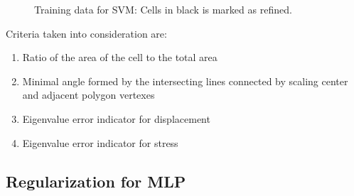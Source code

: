 \begin{figure}[!ht]
\begin{subfigure}[b]{0.49\linewidth}
{        }
    \end{subfigure}
    \begin{subfigure}[b]{0.49\linewidth}
    \end{subfigure}
    \caption[Training data for SVM]{Training data for SVM: Cells in black is marked as refined.}
    \label{adap_fig:svm_train_my}
\end{figure}
%
Criteria taken into consideration are: 
\begin{enumerate}
    \item Ratio of the area of the cell to the total area
    \item Minimal angle formed by the intersecting lines connected by scaling center and adjacent polygon vertexes
    \item Eigenvalue error indicator for displacement
    \item Eigenvalue error indicator for stress
\end{enumerate}
%
\subsection{Regularization for MLP}
